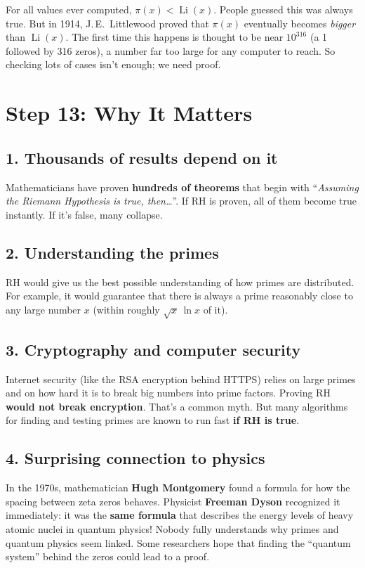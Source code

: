 \documentclass[11pt,a4paper]{article}
\newcommand{\Li}{\operatorname{Li}}
\begin{document}
\begin{example}
For all values ever computed, $\pi(x) < \Li(x)$. People guessed this was always true. But in 1914, J.\,E.\ Littlewood proved that $\pi(x)$ eventually becomes \emph{bigger} than $\Li(x)$. The first time this happens is thought to be near $10^{316}$ (a 1 followed by 316 zeros), a number far too large for any computer to reach. So checking lots of cases isn't enough; we need proof.
\end{example}

\section{Step 13: Why It Matters}

\subsection*{1. Thousands of results depend on it}
Mathematicians have proven \textbf{hundreds of theorems} that begin with ``\emph{Assuming the Riemann Hypothesis is true, then\ldots}''. If RH is proven, all of them become true instantly. If it's false, many collapse.

\subsection*{2. Understanding the primes}
RH would give us the best possible understanding of how primes are distributed. For example, it would guarantee that there is always a prime reasonably close to any large number $x$ (within roughly $\sqrt{x}\,\ln x$ of it).

\subsection*{3. Cryptography and computer security}
Internet security (like the RSA encryption behind HTTPS) relies on large primes and on how hard it is to break big numbers into prime factors. Proving RH \textbf{would not break encryption}. That's a common myth. But many algorithms for finding and testing primes are known to run fast \textbf{if RH is true}.

\subsection*{4. Surprising connection to physics}
In the 1970s, mathematician \textbf{Hugh Montgomery} found a formula for how the spacing between zeta zeros behaves. Physicist \textbf{Freeman Dyson} recognized it immediately: it was the \textbf{same formula} that describes the energy levels of heavy atomic nuclei in quantum physics! Nobody fully understands why primes and quantum physics seem linked. Some researchers hope that finding the ``quantum system'' behind the zeros could lead to a proof.
\end{document}
